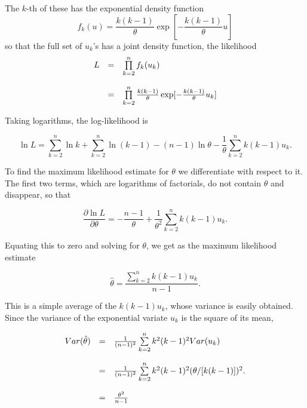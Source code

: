 The $k$-th of these has the exponential density function
\begin{equation} %
    f_k(u)   =  \frac{k(k-1)}{\theta} \exp [ - \frac{k(k-1)}{\theta} u ]
\end{equation}
so that the full set of $u_k$'s has a joint density function, the
likelihood
\begin{equation} %
\begin{array}{l c l}
         L &  =  &  \prod\limits_{k=2}^n f_k(u_k) \\
           &     &  \\
           &  =  &  \prod\limits_{k=2}^n \frac{k(k-1)}{\theta} \exp [- \frac{k(k-1)}{\theta}u_k]
\end{array}
\end{equation}

Taking logarithms, the log-likelihood is

\begin{equation} %
\ln L  =  \sum\limits_{k=2}^n \ln k  +  \sum\limits_{k=2}^n \ln (k-1)  -  (n-1) \ln \theta  - \frac{1}{\theta} \sum\limits_{k=2}^n k(k-1) u_k.
\end{equation}

To find the maximum likelihood estimate for $\theta$ we differentiate with
respect to it.  The first two terms, which are logarithms of factorials,
do not contain $\theta$ and disappear, so that

\begin{equation} %
\frac{\partial \ln L}{\partial \theta}  =  - \frac{n-1}{\theta} +
 \frac{1}{\theta^2} \sum\limits_{k=2}^n k(k-1) u_k.
\end{equation}

Equating this to zero and solving for $\theta$, we get as the maximum
likelihood estimate

\begin{equation} %
\hat{\theta} = \frac{\sum\limits_{k=2}^n k(k-1) u_k}{n-1}.
\end{equation}

This is a simple average of the $k(k-1)u_k$, whose variance is
easily obtained.  Since the variance of the exponential variate $u_k$ is the
square of its mean,

\begin{equation} %
\begin{array}{l c l}
Var (\hat{\theta})& = & \frac{1}{(n-1)^2} \sum\limits_{k=2}^n k^2 (k-1)^2
Var(u_k) \\
   &   & \\
  & = &  \frac{1}{(n-1)^2} \sum\limits_{k=2}^n k^2 (k-1)^2 (\theta / [k(k-1)])^2. \\
   &   & \\
  & = &  \frac{\theta^2}{n-1}
\end{array}
\end{equation}

